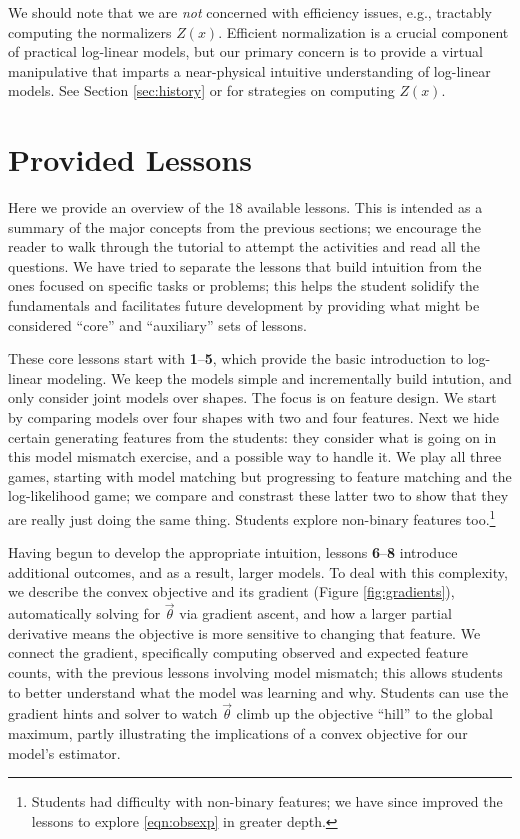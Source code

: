 \documentclass[11pt,letterpaper]{article}
\newcommand{\Note}[1]{}
\renewcommand{\Note}[1]{\hl{[#1]}}  %
\newcommand{\NoteSigned}[3]{{\sethlcolor{#2}\Note{#1: #3}}}
\newcommand{\NoteFF}[1]{\NoteSigned{FF}{LightBlue}{#1}}
\newcommand{\NumLessons}[0]{18}%
\begin{document}
We should note that we are \textit{not} concerned with efficiency issues, e.g.,  
tractably computing the normalizers $Z(x)$. Efficient normalization
is a crucial component of practical log-linear models, but our primary concern is to provide a virtual 
manipulative that imparts a near-physical intuitive understanding of log-linear models. See Section 
\ref{sec:history} or  for strategies on computing
$Z(x)$.



\section{Provided Lessons}\label{sec:lessons}
Here we provide an overview of the \NumLessons{} available lessons. This is intended as a 
summary of the major concepts from the previous sections; we encourage the reader to 
walk through the tutorial to attempt the activities and read all the questions. We have tried to 
separate the lessons that build intuition from the ones focused on specific tasks or problems; this helps 
the student solidify the fundamentals and facilitates future development by providing what might be considered 
``core'' and ``auxiliary'' sets of lessons.

These core lessons start with \textbf{1}--\textbf{5}, which provide the basic introduction to log-linear modeling. We keep 
the models simple and incrementally build intution, and only consider joint models over shapes. The focus is 
on feature design. We start by comparing models over four shapes with two and four features. 
Next we hide certain generating features from the students: they 
consider what is going on in this model mismatch exercise, and a possible way to handle it. We play all three games, 
starting with model matching but progressing to feature matching and the log-likelihood game; we compare and 
constrast these latter two to show that they are really just doing the same thing. Students explore 
non-binary features too.\footnote{Students had difficulty with non-binary features; 
we have since improved the lessons to explore \eqref{eqn:obsexp} in greater depth.} 

Having begun to develop the appropriate intuition, lessons \textbf{6}--\textbf{8} introduce 
additional outcomes, and as a result, larger models. To deal with this complexity, we describe the convex 
objective and its gradient 
(Figure \ref{fig:gradients}), 
automatically solving for $\vec{\theta}$ via gradient ascent, and how a larger partial derivative means the objective is more 
sensitive to changing that feature. We connect the gradient, specifically computing observed and expected feature 
counts, with the previous lessons involving model mismatch; this allows students to better understand what the 
model was learning and why. 
Students can use the gradient hints and solver to watch $\vec{\theta}$ climb up the objective ``hill'' to the global maximum, 
partly illustrating the implications of a convex objective for our model's estimator.
\end{document}
